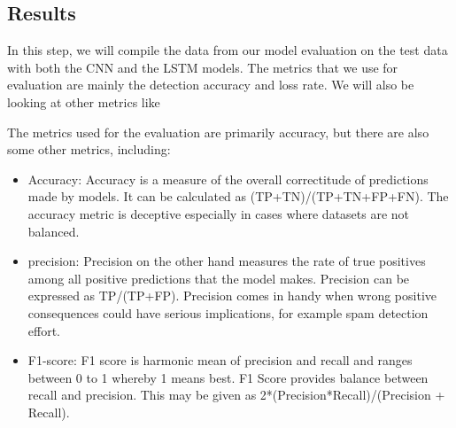 










\subsection{Results}
In this step, we will compile the data from our model evaluation on the test data with both the CNN and the LSTM models. The metrics that we use for evaluation are mainly the detection accuracy and loss rate. We will also be looking at other metrics like

The metrics used for the evaluation are primarily accuracy, but there are also some other metrics, including:
\begin{itemize}
	\item Accuracy: Accuracy is a measure of the overall correctitude of predictions made by models. It can be calculated as (TP+TN)/(TP+TN+FP+FN). The accuracy metric is deceptive especially in cases where datasets are not balanced.
	\item precision: Precision on the other hand measures the rate of true positives among all positive predictions that the model makes. Precision can be expressed as TP/(TP+FP). Precision comes in handy when wrong positive consequences could have serious implications, for example spam detection effort.
	\item F1-score: F1 score is harmonic mean of precision and recall and ranges between 0 to 1 whereby 1 means best. F1 Score provides balance between recall and precision. This may be given as 2*(Precision*Recall)/(Precision + Recall).
\end{itemize}












